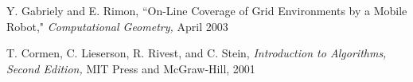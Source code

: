 \documentclass[letterpaper, 12pt, leqno]{report}
\begin{document}
\noindent [8] Y. Gabriely and E. Rimon, ``On-Line Coverage of Grid Environments by a Mobile Robot," \textit{Computational Geometry,} April 2003

\noindent [9] T. Cormen, C. Lieserson, R. Rivest, and C. Stein, \textit{Introduction to Algorithms, Second Edition,} MIT Press and McGraw-Hill, 2001




\end{document}
